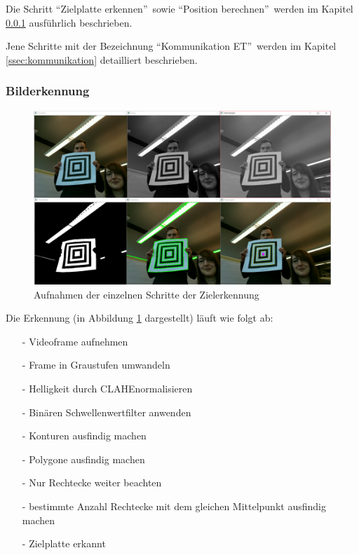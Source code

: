 \documentclass[a4paper]{report}
\begin{document}
Die Schritt \textquotedblleft Zielplatte erkennen\textquotedblright\ sowie \textquotedblleft Position berechnen\textquotedblright\ werden im Kapitel \ref{ssec:bilderkennung} ausführlich beschrieben.

Jene Schritte mit der Bezeichnung \textquotedblleft Kommunikation ET\textquotedblright\ werden im Kapitel \ref{ssec:kommunikation} detailliert beschrieben.

\subsubsection{Bilderkennung}
\label{ssec:bilderkennung}

\begin{figure}[h!]
	\centering
	\includegraphics[keepaspectratio,width=\textwidth]{BilderkennungAblauf}
	\caption{Aufnahmen der einzelnen Schritte der Zielerkennung}
	\label{fig:AufnahmeZielerkennung}
\end{figure}

Die Erkennung (in Abbildung \ref{fig:AufnahmeZielerkennung} dargestellt) läuft wie folgt ab:

\begin{itemize}[noitemsep]
	\item[-] Videoframe aufnehmen
	\item[-] Frame in Graustufen umwandeln
	\item[-] Helligkeit durch CLAHE\footnotemark normalisieren
	\item[-] Binären Schwellenwertfilter anwenden
	\item[-] Konturen ausfindig machen
	\item[-] Polygone ausfindig machen
	\item[-] Nur Rechtecke weiter beachten
	\item[-] bestimmte Anzahl Rechtecke mit dem gleichen Mittelpunkt ausfindig machen
	\item[-] Zielplatte erkannt
\end{itemize}
\end{document}
